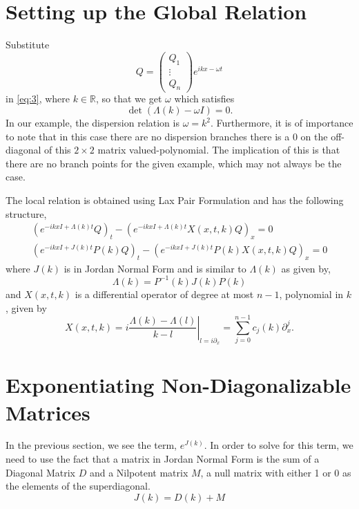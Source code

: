 \documentclass{article}
\begin{document}
\section{Setting up the Global Relation}
    Substitute
\begin{equation} \label{eq:5}
    Q = \left(\begin{array}{c}
         Q_1  \\
         \vdots \\
         Q_n
    \end{array} \right) e^{ikx - \omega t}
\end{equation}
in \eqref{eq:3}, where $k \in \mathbb{R}$, so that we get $\omega$ which satisfies
\begin{equation} \label{eq:6}
    \det(\Lambda(k) - \omega I) = 0.
\end{equation}
In our example, the dispersion relation is $\omega = k^2$. Furthermore, it is of importance to note that in this case there are no dispersion branches there is a 0 on the off-diagonal of this $2 \times 2$ matrix valued-polynomial. The implication of this is that there are no branch points for the given example, which may not always be the case.

The local relation is obtained using Lax Pair Formulation and has the following structure,
\begin{align}
    (e^{-ikxI + \Lambda(k)t}Q)_t -(e^{-ikxI + \Lambda(k)t}X(x,t,k)Q)_x = 0 \label{eq:7} \\
    (e^{-ikxI + J(k)t}P(k)Q)_t -(e^{-ikxI + J(k)t}P(k)X(x,t,k)Q)_x = 0 \label{eq:8}
\end{align}
where $J(k)$ is in Jordan Normal Form and is similar to $\Lambda(k)$ as given by,
\begin{equation} \label{eq:9}
   \Lambda(k) = P^{-1}(k)J(k)P(k)
\end{equation}
and $X(x,t,k)$ is a differential operator of degree at most $n-1$, polynomial in $k$, given by
\begin{equation}\label{eq:10}
    X(x,t,k) = i\left.\frac{\Lambda(k)-\Lambda(l)}{k-l}\right|_{l=i\partial_x} = \sum_{j=0}^{n-1}c_j(k)\partial^j_x.
\end{equation}
\section{Exponentiating Non-Diagonalizable Matrices}
 In the previous section, we see the term, $e^{J(k)}$. In order to solve for this term, we need to use the fact that a matrix in Jordan Normal Form is the sum of a Diagonal Matrix $D$ and a Nilpotent matrix $M$, a null matrix with either 1 or 0 as the elements of the superdiagonal.
\begin{equation}\label{eq:11}
    J(k) = D(k) + M
\end{equation}
\end{document}
